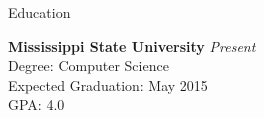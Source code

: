 \documentclass{resume} %
\begin{document}






\begin{rSection}{Education}

	{\bf Mississippi State University} \hfill {\em Present} \\ 
	Degree: Computer Science \\
	Expected Graduation: May 2015 \\
	GPA: 4.0

\end{rSection}


\end{document}
